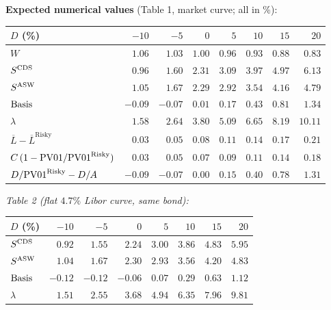 \documentclass[11pt,a4paper]{article}
\begin{document}
\begin{validation}
\textbf{Expected numerical values} (Table 1, market curve; all in \%):

\smallskip
\begin{tabular}{@{}lrrrrrrr@{}}
\toprule
$D$ (\%)                            & $-10$  & $-5$   & $0$    & $5$    & $10$   & $15$   & $20$  \\
\midrule
$W$                                 & $1.06$ & $1.03$ & $1.00$ & $0.96$ & $0.93$ & $0.88$ & $0.83$ \\
$S^{\mathrm{CDS}}$                             & $0.96$ & $1.60$ & $2.31$ & $3.09$ & $3.97$ & $4.97$ & $6.13$ \\
$S^{\mathrm{ASW}}$                             & $1.05$ & $1.67$ & $2.29$ & $2.92$ & $3.54$ & $4.16$ & $4.79$ \\
$\mathrm{Basis}$                            & $-0.09$& $-0.07$& $0.01$ & $0.17$ & $0.43$ & $0.81$ & $1.34$ \\
$\lambda$                           & $1.58$ & $2.64$ & $3.80$ & $5.09$ & $6.65$ & $8.19$ & $10.11$ \\
$\overline L - \overline L^{\text{Risky}}$ & $0.03$ & $0.05$ & $0.08$ & $0.11$ & $0.14$ & $0.17$ & $0.21$ \\
$C\,(1 - \mathrm{PV01} / \mathrm{PV01}^{\text{Risky}})$ & $0.03$ & $0.05$ & $0.07$ & $0.09$ & $0.11$ & $0.14$ & $0.18$ \\
$D / \mathrm{PV01}^{\text{Risky}} - D / A$ & $-0.09$& $-0.07$& $0.00$ & $0.15$ & $0.40$ & $0.78$ & $1.31$ \\
\bottomrule
\end{tabular}
\smallskip

\textit{Table 2 (flat $4.7\%$ Libor curve, same bond):}

\smallskip
\begin{tabular}{@{}lrrrrrrr@{}}
\toprule
$D$ (\%)                            & $-10$  & $-5$   & $0$    & $5$    & $10$   & $15$   & $20$  \\
\midrule
$S^{\mathrm{CDS}}$                             & $0.92$ & $1.55$ & $2.24$ & $3.00$ & $3.86$ & $4.83$ & $5.95$ \\
$S^{\mathrm{ASW}}$                             & $1.04$ & $1.67$ & $2.30$ & $2.93$ & $3.56$ & $4.20$ & $4.83$ \\
$\mathrm{Basis}$                            & $-0.12$& $-0.12$& $-0.06$& $0.07$ & $0.29$ & $0.63$ & $1.12$ \\
$\lambda$                           & $1.51$ & $2.55$ & $3.68$ & $4.94$ & $6.35$ & $7.96$ & $9.81$ \\
\bottomrule
\end{tabular}
\smallskip


\end{validation}
\end{document}
